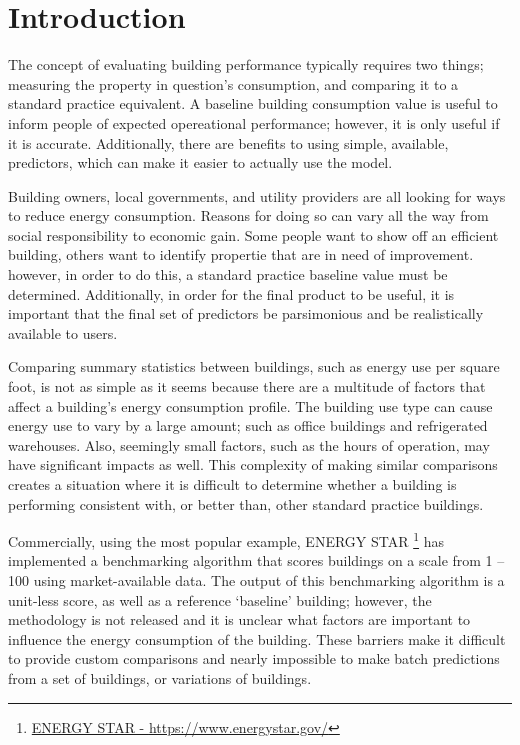 {\section*{Introduction}}

The concept of evaluating building performance typically requires two things; measuring the property in question's consumption, and comparing it to a standard practice equivalent.  A baseline building consumption value is useful to inform people of expected opereational performance; however, it is only useful if it is accurate.  Additionally, there are benefits to using simple, available, predictors, which can make it easier to actually use the model.

Building owners, local governments, and utility providers are all looking for ways to reduce energy consumption.  Reasons for doing so can vary all the way from social responsibility to economic gain.  Some people want to show off an efficient building, others want to identify propertie that are in need of improvement.  however, in order to do this, a standard practice baseline value must be determined.  Additionally, in order for the final product to be useful, it is important that the final set of predictors be parsimonious and be realistically available to users.

Comparing summary statistics between buildings, such as energy use per square foot, is not as simple as it seems because there are a multitude of factors that affect a building’s energy consumption profile.  The building use type can cause energy use to vary by a large amount; such as office buildings and refrigerated warehouses.  Also, seemingly small factors, such as the hours of operation, may have significant impacts as well.  This complexity of making similar comparisons creates a situation where it is difficult to determine whether a building is performing consistent with, or better than, other standard practice buildings.

Commercially, using the most popular example, ENERGY STAR \footnote{\href{https://www.energystar.gov/}{ENERGY STAR - \url{https://www.energystar.gov/}}} has implemented a benchmarking algorithm that scores buildings on a scale from 1 – 100 using market-available data.  The output of this benchmarking algorithm is a unit-less score, as well as a reference ‘baseline’ building; however, the methodology is not released and it is unclear what factors are important to influence the energy consumption of the building.  These barriers make it difficult to provide custom comparisons and nearly impossible to make batch predictions from a set of buildings, or variations of buildings.

